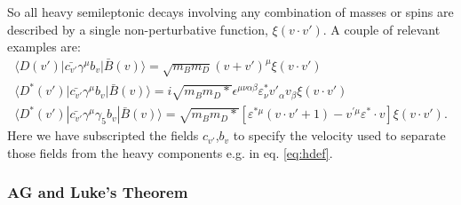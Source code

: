 So all heavy semileptonic decays involving any combination of masses or spins are described by a single non-perturbative function, $\xi(v\cdot v')$. A couple of relevant examples are:
\begin{align}
	\langle D(v') | \bar{c_{v'}} \gamma^{\mu} b_v | \bar{B}(v) \rangle = \sqrt{m_B m_D} ( v + v')^{\mu} \xi(v\cdot v') \\
	\langle D^*(v') | \bar{c_{v'}} \gamma^{\mu} b_v | \bar{B}(v) \rangle = i \sqrt{m_B m_D*} \epsilon^{\mu\nu\alpha\beta} \varepsilon_{\nu}^* v'_{\alpha} v_{\beta} \xi(v\cdot v')  \\
	\langle D^*(v') | \bar{c_{v'}} \gamma^{\mu}\gamma_5 b_v | \bar{B}(v) \rangle = \sqrt{m_B m_D*} [ \varepsilon^{*\mu}(v\cdot v' + 1) - v^{'\mu} \varepsilon^*\cdot v] \xi(v\cdot v').
\end{align}
Here we have subscripted the fields $c_{v'}$,$b_v$ to specify the velocity used to separate those fields from the heavy components e.g. in eq. \eqref{eq:hdef}. 

\subsubsection{AG and Luke's Theorem}


